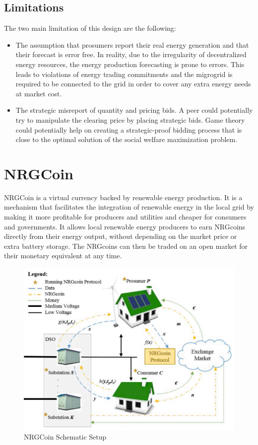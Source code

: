 \subsection{Limitations}
The two main limitation of this design are the following:
\begin{itemize}
    \item The assumption that prosumers report their real energy generation and that their forecast is error free. In reality, due
          to the irregularity of decentralized energy resources, the energy production forecasting is prone to errors. This leads to violations of energy trading
          commitments and the migrogrid is required to be connected to the grid in order to cover any extra energy needs at market cost.
    \item The strategic misreport of quantity and pricing bids. A peer could potentially try to manipulate the clearing price by placing strategic bids.
          Game theory could potentially help on creating a strategic-proof bidding process that is close to the optimal solution of the social welfare maximization
          problem.
\end{itemize}

\section{NRGCoin}
\label{sec:nrgc}
NRGCoin is a virtual currency backed by renewable energy production. It is a mechanism that facilitates the integration of renewable energy in the local grid
by making it more profitable for producers and utilities and cheaper for consumers and governments.
It allows local renewable energy producers to earn NRGcoins directly from their energy output, without depending on the market price or extra battery storage.
The NRGcoins can then be traded on an open market for their monetary equivalent at any time.\\
\begin{figure}[h!]
    \centering
    \includegraphics[scale=0.8]{Figures/nrgcoin.png}
    \caption{NRGCoin Schematic Setup \cite{NRGCoin}}
\end{figure}

